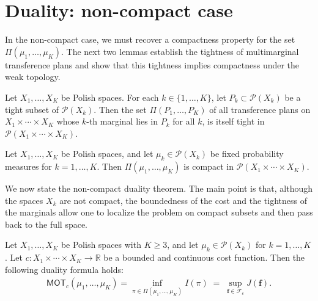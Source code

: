 \documentclass[twoside,11pt,a4paper]{article}
\begin{document}
\section{Duality: non-compact case}\label{secdual2}
In the non-compact case, we must recover a compactness property for the set 
$\Pi(\mu_1,\dots,\mu_K)$. The next two lemmas establish the tightness of multimarginal transference plans and show that this tightness implies compactness under the weak topology. 

\begin{lemma}\label{tight}
Let $X_1,\dots,X_K$ be Polish spaces.  
For each $k\in\{1,\dots,K\}$, let $P_k \subset \mathcal P(X_k)$ be a tight subset of $\mathcal P(X_k)$.  
Then the set $\Pi(P_1,\dots,P_K)$ of all transference plans on $X_1 \times \cdots \times X_K$ whose $k$-th marginal lies in $P_k$ for all $k$, is itself tight in $\mathcal P(X_1 \times \cdots \times X_K)$.
\end{lemma}
\begin{lemma}\label{compact}
Let $X_1,\dots,X_K$ be Polish spaces, and let $\mu_k \in \mathcal P(X_k)$ be fixed probability measures for $k=1,\dots,K$.    
Then $\Pi(\mu_1,\dots,\mu_K)$ is compact in $\mathcal P(X_1 \times \cdots \times X_K)$.
\end{lemma}
\medskip

We now state the non-compact duality theorem. The main point is that, although the spaces \(X_k\) are not compact, the boundedness of the cost and the tightness of the marginals allow one to localize the problem on compact subsets and then pass back to the full space.

\begin{theorem}\label{KANTO2}

Let $X_1,\dots,X_K$ be Polish spaces with $K\geq 3$, and let $\mu_k \in \mathcal P(X_k)$ for $k=1,\dots,K$.  
Let $c : X_1 \times \cdots \times X_K \longrightarrow \mathbb{R}$ be a bounded and continuous cost function. Then the following duality formula holds:
\begin{align*}
\mathsf{MOT}_c(\mu_1,\ldots,\mu_K)
= \inf_{\pi \in \Pi(\mu_1,\dots,\mu_K)} I(\pi)
\;=\;
\sup_{\boldsymbol{f} \in \mathcal F_c}J(\boldsymbol{f}).
\end{align*}
\end{theorem}
\end{document}
